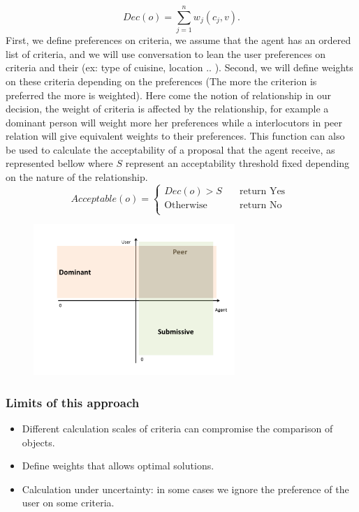 \documentclass{llncs}
\begin{document}
\[Dec(o) = \sum_{j=1}^{n} w_j (c_j,v).\] 
 First, we define preferences on criteria, we assume that the agent has an ordered list of criteria, and we will use  conversation to lean the user preferences on criteria and their (ex: type of cuisine, location .. ). Second, we will define weights on these criteria depending on the preferences (The more the criterion is preferred the more is weighted). Here come the notion of relationship in our decision, the weight of criteria is affected by the relationship, for example a dominant person will weight more her preferences while a interlocutors in peer relation will give equivalent weights to their preferences.  This function can also be used to calculate the acceptability of a proposal that the agent receive, as represented bellow where $S$ represent an acceptability threshold fixed depending on the nature of the relationship.
  \[ Acceptable(o) =
 \begin{cases}
    Dec(o) > S & \quad \text{return Yes }\\
  \text{Otherwise} & \quad \text{return No}\\
 \end{cases}
 \]
 
 \begin{figure}
 	\centerline{\includegraphics[width=3in]{figs/multiCriteria}}
 	\vskip 8pt
 \end{figure}
\subsubsection{Limits of this approach}
\begin{itemize}
\item Different calculation scales of criteria can compromise the comparison of objects. 
\item Define weights that allows optimal solutions. 
\item Calculation under uncertainty: in some cases we ignore the preference of the user on some criteria. 
\end{itemize}
\noindent 
\vskip 4pt


\end{document}
